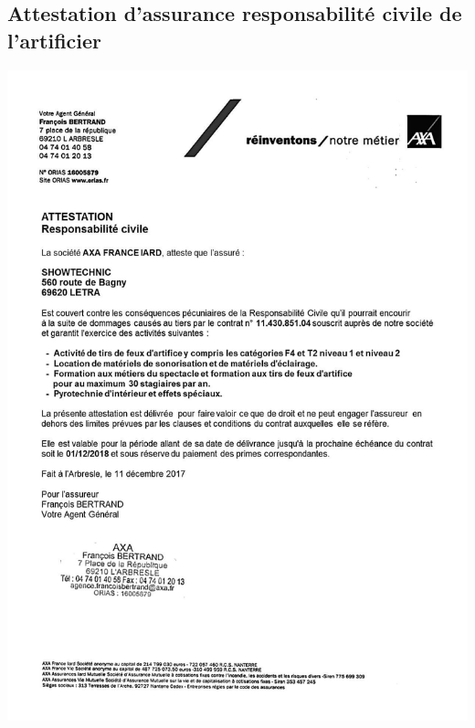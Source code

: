 \documentclass[hidelinks, paper=a4, fontsize=13pt]{report}
\begin{document}
\subsection{Attestation d’assurance responsabilité civile de l’artificier}
\begin{center}
	\includegraphics[scale=0.70,keepaspectratio]{Annexes/Documents/AttestationAssuranceShowtechnic}
\end{center}
\end{document}
